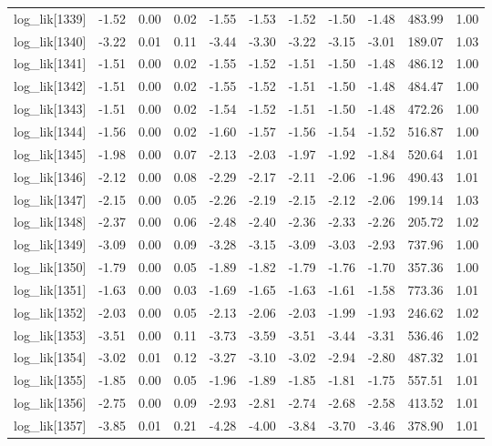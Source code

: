 \begin{table}[ht]
\begin{tabular}{rrrrrrrrrrr}
  log\_lik[1339] & -1.52 & 0.00 & 0.02 & -1.55 & -1.53 & -1.52 & -1.50 & -1.48 & 483.99 & 1.00 \\ 
  log\_lik[1340] & -3.22 & 0.01 & 0.11 & -3.44 & -3.30 & -3.22 & -3.15 & -3.01 & 189.07 & 1.03 \\ 
  log\_lik[1341] & -1.51 & 0.00 & 0.02 & -1.55 & -1.52 & -1.51 & -1.50 & -1.48 & 486.12 & 1.00 \\ 
  log\_lik[1342] & -1.51 & 0.00 & 0.02 & -1.55 & -1.52 & -1.51 & -1.50 & -1.48 & 484.47 & 1.00 \\ 
  log\_lik[1343] & -1.51 & 0.00 & 0.02 & -1.54 & -1.52 & -1.51 & -1.50 & -1.48 & 472.26 & 1.00 \\ 
  log\_lik[1344] & -1.56 & 0.00 & 0.02 & -1.60 & -1.57 & -1.56 & -1.54 & -1.52 & 516.87 & 1.00 \\ 
  log\_lik[1345] & -1.98 & 0.00 & 0.07 & -2.13 & -2.03 & -1.97 & -1.92 & -1.84 & 520.64 & 1.01 \\ 
  log\_lik[1346] & -2.12 & 0.00 & 0.08 & -2.29 & -2.17 & -2.11 & -2.06 & -1.96 & 490.43 & 1.01 \\ 
  log\_lik[1347] & -2.15 & 0.00 & 0.05 & -2.26 & -2.19 & -2.15 & -2.12 & -2.06 & 199.14 & 1.03 \\ 
  log\_lik[1348] & -2.37 & 0.00 & 0.06 & -2.48 & -2.40 & -2.36 & -2.33 & -2.26 & 205.72 & 1.02 \\ 
  log\_lik[1349] & -3.09 & 0.00 & 0.09 & -3.28 & -3.15 & -3.09 & -3.03 & -2.93 & 737.96 & 1.00 \\ 
  log\_lik[1350] & -1.79 & 0.00 & 0.05 & -1.89 & -1.82 & -1.79 & -1.76 & -1.70 & 357.36 & 1.00 \\ 
  log\_lik[1351] & -1.63 & 0.00 & 0.03 & -1.69 & -1.65 & -1.63 & -1.61 & -1.58 & 773.36 & 1.01 \\ 
  log\_lik[1352] & -2.03 & 0.00 & 0.05 & -2.13 & -2.06 & -2.03 & -1.99 & -1.93 & 246.62 & 1.02 \\ 
  log\_lik[1353] & -3.51 & 0.00 & 0.11 & -3.73 & -3.59 & -3.51 & -3.44 & -3.31 & 536.46 & 1.02 \\ 
  log\_lik[1354] & -3.02 & 0.01 & 0.12 & -3.27 & -3.10 & -3.02 & -2.94 & -2.80 & 487.32 & 1.01 \\ 
  log\_lik[1355] & -1.85 & 0.00 & 0.05 & -1.96 & -1.89 & -1.85 & -1.81 & -1.75 & 557.51 & 1.01 \\ 
  log\_lik[1356] & -2.75 & 0.00 & 0.09 & -2.93 & -2.81 & -2.74 & -2.68 & -2.58 & 413.52 & 1.01 \\ 
  log\_lik[1357] & -3.85 & 0.01 & 0.21 & -4.28 & -4.00 & -3.84 & -3.70 & -3.46 & 378.90 & 1.01 \\ 

\end{tabular}
\end{table}
